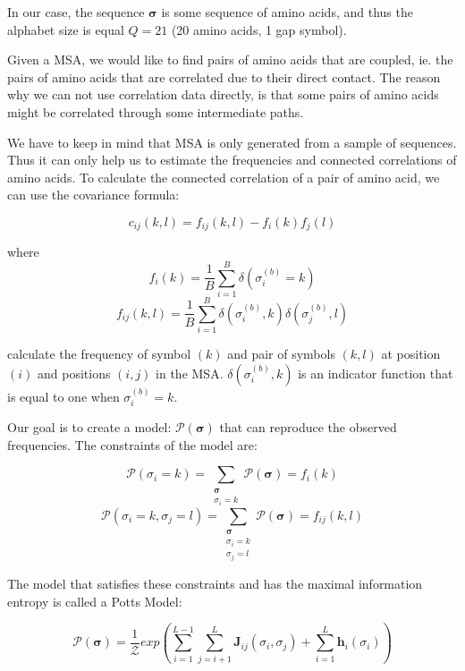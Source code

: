 In our case, the sequence $\boldsymbol{\sigma}$ is some sequence of amino acids, and thus the alphabet size is equal $Q = 21$ (20 amino acids, 1 gap symbol).
        
Given a MSA, we would like to find pairs of amino acids that are coupled, ie. the pairs of amino acids that are correlated due to their direct contact. 
The reason why we can not use correlation data directly, is that some pairs of amino acids might be correlated through some intermediate paths.
        
We have to keep in mind that MSA is only generated from a sample of sequences. 
Thus it can only help us to estimate the frequencies and connected correlations of amino acids. 
To calculate the connected correlation of a pair of amino acid, we can use the covariance formula:
            
$$c_{ij}(k, l) = f_{ij}(k, l) - f_i(k) f_j(l)$$
        
where
$$f_i(k) = \frac{1}{B} \sum_{i = 1}^B \delta(\sigma_i^{(b)} = k)$$
$$f_{ij}(k, l) = \frac{1}{B} \sum_{i = 1}^B \delta(\sigma_i^{(b)}, k)\delta(\sigma_j^{(b)}, l)$$
        
calculate the frequency of symbol $(k)$ and pair of symbols $(k, l)$ at position $(i)$ and positions $(i, j)$ in the MSA. 
$\delta(\sigma_i^{(b)}, k)$ is an indicator function that is equal to one when $\sigma_i^{(b)} = k$.
        
        
Our goal is to create a model: $\mathcal{P(\bm{\sigma})}$ that can reproduce the observed frequencies. 
The constraints of the model are:
        
$$\mathcal{P}(\sigma_i = k) = \sum_{\substack{\bm{\sigma}\\ \sigma_i = k}} \mathcal{P}(\bm{\sigma}) = f_i(k)$$
$$\mathcal{P}(\sigma_i = k, \sigma_j = l) = \sum_{\substack{\bm{\sigma}\\ \sigma_i = k \\ \sigma_j = l}} \mathcal{P}(\bm{\sigma}) = f_{ij}(k, l)$$
        
The model that satisfies these constraints and has the maximal information entropy is called a Potts Model:
        
\begin{equation}
    \mathcal{P}(\bm{\sigma}) = \frac{1}{\mathcal{Z}} exp\left(\sum_{i = 1}^{L-1} \sum_{j=i+1}^L \bm{J}_{ij}(\sigma_i, \sigma_j) + \sum_{i=1}^L \bm{h}_i({\sigma_i})\right)
    \label{eq:Potts}
\end{equation}
    

